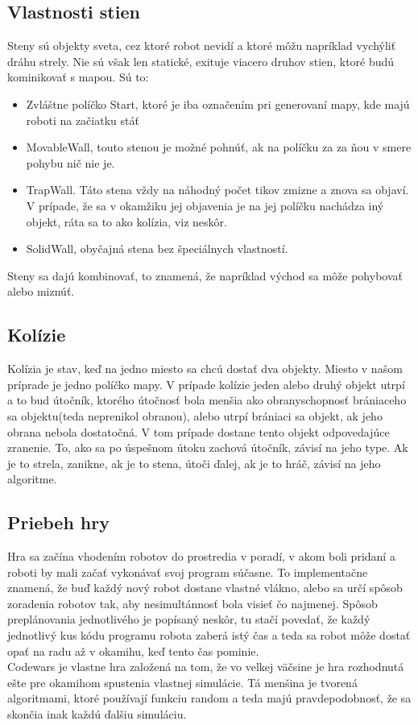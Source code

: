 \subsection{Vlastnosti stien} %
Steny sú objekty sveta, cez ktoré robot nevidí a ktoré môžu napríklad vychýliť dráhu strely. Nie sú však len statické, exituje viacero druhov stien, ktoré budú kominikovať s mapou. Sú to:\\
\begin{itemize}
\item Zvláštne políčko Start, ktoré je iba označením pri generovaní mapy, kde majú roboti na začiatku stáť 
\item MovableWall, touto stenou je možné pohnúť, ak na políčku za za ňou v smere pohybu nič nie je.
\item TrapWall. Táto stena vždy na náhodný počet tikov zmizne a znova sa objaví. V prípade, že sa v okamžiku jej objavenia je na jej políčku nachádza iný objekt, ráta sa to ako kolízia, viz neskôr.%
\item SolidWall, obyčajná stena bez špeciálnych vlastností.
\end {itemize}
Steny sa dajú kombinovať, to znamená, že napríklad východ sa môže pohybovať alebo miznúť. 

\subsection{Kolízie}\label{kolizie}
Kolízia je stav, keď na jedno miesto sa chcú dostať dva objekty. Miesto v našom príprade je jedno políčko mapy. V prípade kolízie jeden alebo druhý objekt utrpí a to bud útočník, ktorého útočnosť bola menšia ako obranyschopnosť brániaceho sa objektu(teda neprenikol obranou), alebo utrpí brániaci sa objekt, ak jeho obrana nebola dostatočná. V tom prípade dostane tento objekt odpovedajúce zranenie. To, ako sa po úspešnom útoku zachová útočník, závisí na jeho type. Ak je to strela, zanikne, ak je to stena, útoči ďalej, ak je to hráč, závisí na jeho algoritme.

\subsection {Priebeh hry}
Hra sa začína vhodením robotov do prostredia v poradí, v akom boli pridaní a roboti by mali začať vykonávať svoj program súčasne. To implementačne znamená, že buď každý nový robot dostane vlastné vlákno, alebo sa určí spôsob zoradenia robotov tak, aby nesimultánnosť bola visieť čo najmenej. Spôsob preplánovania jednotlivého je popísaný neskôr, tu stačí povedať, že každý jednotlivý kus kódu programu robota zaberá istý čas a teda sa robot môže dostať opať na radu až v okamihu, keď tento čas pominie. \\
Codewars je vlastne hra založená na tom, že vo velkej väčsine je hra rozhodnutá ešte pre okamihom spustenia vlastnej simulácie. Tá menšina je tvorená algoritmami, ktoré používají funkciu random a teda majú pravdepodobnosť, že sa skončia inak každú ďalšiu simuláciu.
